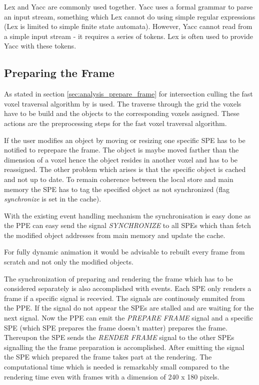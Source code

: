 \documentclass[DIV10, abstracton, openright, footsepline, headsepline, twoside, 9pt,
bigheadings]{scrreprt}
\begin{document}
Lex and Yacc are commonly used together. Yacc uses a formal grammar to
parse an input stream, something which Lex cannot do using simple regular
expressions (Lex is limited to simple finite state automata). However,
Yacc cannot read from a simple input stream - it requires a series of tokens.
Lex is often used to provide Yacc with these tokens.

\subsection{Preparing the Frame}
As stated in section \ref{sec:analysis_prepare_frame} for intersection culling
the fast voxel traversal algorithm by \cite{Woo87} is used. The traverse through
the grid the voxels have to be build and the objects to the corresponding voxels
assigned. These actions are the preprocessing steps for the fast voxel
traversal algorithm.

If the user modifies an object by moving or resizing one specific SPE has to be
notified to reprepare the frame. The object is maybe moved farther than the
dimension of a voxel hence the object resides in another voxel and has to be
reassigned. The other problem which arises is that the specific object is
cached and not up to date. To remain coherence between the local store and
main memory the SPE has to tag the specified object as not synchronized
(flag \textit{synchronize} is set in the cache).

With the existing event handling mechanism the synchronisation is easy done
as the PPE can easy send the signal \textit{SYNCHRONIZE} to all SPEs which
than fetch the modified object addresses from main memory and update the cache.

For fully dynamic animation it would be advisable to rebuilt every frame from
scratch and not only the modified objects.

The synchronization of preparing and rendering the frame which has to be considered
separately is also accomplished with events. Each SPE only renders a frame
if a specific signal is recevied. The signals are continously emmited from the PPE.
If the signal do not appear the SPEs are stalled and are waiting for the next
signal. Now the PPE can emit the \textit{PREPARE FRAME} signal and a specific
SPE (which SPE prepares the frame doesn't matter) prepares the frame. Thereupon
the SPE sends the \textit{RENDER FRAME} signal to the other SPEs signalling
the the frame preparation is accomplished. After emitting the signal the SPE which
prepared the frame takes part at the rendering. The computational time which
is needed is remarkably small compared to the rendering time even with frames
with a dimension of 240 x 180 pixels.
\end{document}
